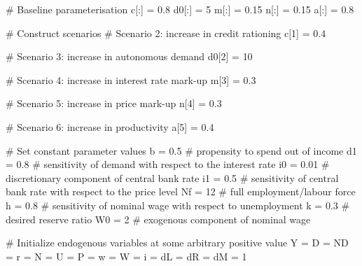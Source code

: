 \documentclass[
  letterpaper,
  DIV=11,
  numbers=noendperiod]{scrreprt}
\newenvironment{Shaded}{\begin{snugshade}}{\end{snugshade}}
\newcommand{\CommentTok}[1]{\textcolor[rgb]{0.37,0.37,0.37}{#1}}
\newcommand{\DecValTok}[1]{\textcolor[rgb]{0.68,0.00,0.00}{#1}}
\newcommand{\FloatTok}[1]{\textcolor[rgb]{0.68,0.00,0.00}{#1}}
\newcommand{\NormalTok}[1]{\textcolor[rgb]{0.00,0.23,0.31}{#1}}
\newcommand{\OperatorTok}[1]{\textcolor[rgb]{0.37,0.37,0.37}{#1}}
\begin{document}
\begin{tcolorbox}
\begin{Shaded}
\begin{Highlighting}[]
\CommentTok{\# Baseline parameterisation}
\NormalTok{c[:] }\OperatorTok{=} \FloatTok{0.8}
\NormalTok{d0[:] }\OperatorTok{=} \DecValTok{5}
\NormalTok{m[:] }\OperatorTok{=} \FloatTok{0.15}
\NormalTok{n[:] }\OperatorTok{=} \FloatTok{0.15}
\NormalTok{a[:] }\OperatorTok{=} \FloatTok{0.8}

\CommentTok{\# Construct scenarios}
\CommentTok{\# Scenario 2: increase in credit rationing}
\NormalTok{c[}\DecValTok{1}\NormalTok{] }\OperatorTok{=} \FloatTok{0.4}

\CommentTok{\# Scenario 3: increase in autonomous demand}
\NormalTok{d0[}\DecValTok{2}\NormalTok{] }\OperatorTok{=} \DecValTok{10}

\CommentTok{\# Scenario 4: increase in interest rate mark{-}up}
\NormalTok{m[}\DecValTok{3}\NormalTok{] }\OperatorTok{=} \FloatTok{0.3}

\CommentTok{\# Scenario 5: increase in price mark{-}up}
\NormalTok{n[}\DecValTok{4}\NormalTok{] }\OperatorTok{=} \FloatTok{0.3}

\CommentTok{\# Scenario 6: increase in productivity}
\NormalTok{a[}\DecValTok{5}\NormalTok{] }\OperatorTok{=} \FloatTok{0.4}

\CommentTok{\# Set constant parameter values}
\NormalTok{b }\OperatorTok{=} \FloatTok{0.5}  \CommentTok{\# propensity to spend out of income}
\NormalTok{d1 }\OperatorTok{=} \FloatTok{0.8}  \CommentTok{\# sensitivity of demand with respect to the interest rate}
\NormalTok{i0 }\OperatorTok{=} \FloatTok{0.01}  \CommentTok{\# discretionary component of central bank rate}
\NormalTok{i1 }\OperatorTok{=} \FloatTok{0.5}  \CommentTok{\# sensitivity of central bank rate with respect to the price level}
\NormalTok{Nf }\OperatorTok{=} \DecValTok{12}  \CommentTok{\# full employment/labour force}
\NormalTok{h }\OperatorTok{=} \FloatTok{0.8}  \CommentTok{\# sensitivity of nominal wage with respect to unemployment}
\NormalTok{k }\OperatorTok{=} \FloatTok{0.3}  \CommentTok{\# desired reserve ratio}
\NormalTok{W0 }\OperatorTok{=} \DecValTok{2}  \CommentTok{\# exogenous component of nominal wage}

\CommentTok{\# Initialize endogenous variables at some arbitrary positive value}
\NormalTok{Y }\OperatorTok{=}\NormalTok{ D }\OperatorTok{=}\NormalTok{ ND }\OperatorTok{=}\NormalTok{ r }\OperatorTok{=}\NormalTok{ N }\OperatorTok{=}\NormalTok{ U }\OperatorTok{=}\NormalTok{ P }\OperatorTok{=}\NormalTok{ w }\OperatorTok{=}\NormalTok{ W }\OperatorTok{=}\NormalTok{ i }\OperatorTok{=}\NormalTok{ dL }\OperatorTok{=}\NormalTok{ dR }\OperatorTok{=}\NormalTok{ dM }\OperatorTok{=} \DecValTok{1}


\end{Highlighting}
\end{Shaded}
\end{tcolorbox}
\end{document}
